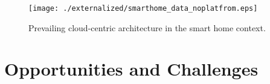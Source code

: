\begin{figure}
\centering
\texttt{[image: ./externalized/smarthome\_data\_noplatfrom.eps]}
\caption{Prevailing cloud-centric architecture in the smart home context.}
\label{fig:smarthome}
\end{figure}





\section{Opportunities and Challenges}








